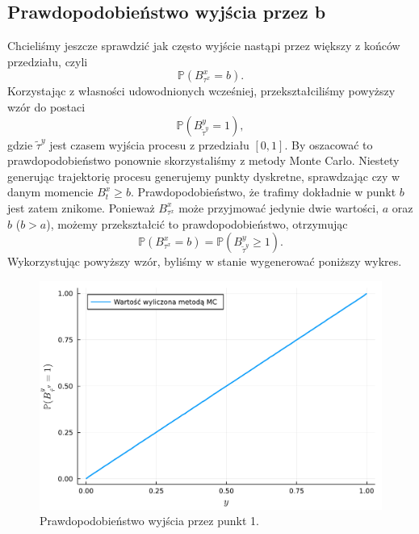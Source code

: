 \documentclass[12pt]{mwart}
\begin{document}
	\subsection{Prawdopodobieństwo wyjścia przez b}
	\noindent Chcieliśmy jeszcze sprawdzić jak często wyjście nastąpi przez większy z końców przedziału, czyli%
	\begin{equation*}
		\mathbb{P}\left(B^x_{\tau^x}=b\right).
	\end{equation*}
	Korzystając z własności udowodnionych wcześniej, przekształciliśmy powyższy wzór do postaci%
	\begin{equation*}
		\mathbb{P}\left(B^y_{\widetilde\tau^y}=1\right),
	\end{equation*}
	gdzie $\widetilde\tau^y$ jest czasem wyjścia procesu z przedziału $[0, 1]$. By oszacować to prawdopodobieństwo ponownie skorzystaliśmy z metody Monte Carlo. Niestety generując trajektorię procesu generujemy punkty dyskretne, sprawdzając czy w danym momencie $B^x_t\geqslant b$. Prawdopodobieństwo, że trafimy dokładnie w punkt $b$ jest zatem znikome. Ponieważ $B^x_{\tau^x}$ może przyjmować jedynie dwie wartości, $a$ oraz $b$ ($b>a$), możemy przekształcić to prawdopodobieństwo, otrzymując
	\begin{equation}\label{eq:dyskretyzaction}
		\mathbb{P}\left(B^x_{\tau^x}=b\right)=\mathbb{P}\left(B^y_{\widetilde{\tau}^y}\geqslant1\right).
	\end{equation}
	 Wykorzystując powyższy wzór, byliśmy w stanie wygenerować poniższy wykres.
	\begin{figure}[H]
		\includegraphics[width=\columnwidth]{fig/plot/prob.pdf}
		\caption{Prawdopodobieństwo wyjścia przez punkt 1.}
	\end{figure}
\end{document}
